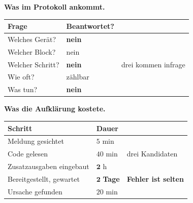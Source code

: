 \begin{merksatz}
\textbf{Was im Protokoll ankommt.}

\begin{center}
\begin{minipage}{0.86\textwidth}
\end{minipage}
\end{center}

\begin{center}
{\small
\renewcommand{\arraystretch}{1.45}
\begin{tabular}{@{}P{3.0cm}P{2.2cm}P{2.6cm}@{}}
\toprule
\textbf{Frage} & \textbf{Beantwortet?} & \\
\midrule
Welches Gerät? & \textcolor{akzent}{\textbf{nein}} & \\
Welcher Block? & \textcolor{akzent}{nein} & \\
Welcher Schritt? & \textcolor{akzent}{\textbf{nein}} & \textcolor{akzent}{drei kommen infrage}\\
Wie oft? & \textcolor{mittel}{zählbar} & \\
Was tun? & \textcolor{akzent}{\textbf{nein}} & \\
\bottomrule
\end{tabular}}
\end{center}

\begin{center}
\begin{minipage}{0.88\textwidth}
\end{minipage}
\end{center}

\textbf{Was die Aufklärung kostete.}

\begin{center}
\renewcommand{\arraystretch}{1.45}
\begin{tabular}{@{}P{3.0cm}P{2.2cm}P{2.6cm}@{}}
\toprule
\textbf{Schritt} & \textbf{Dauer} & \\
\midrule
Meldung gesichtet & $5$ min & \\
Code gelesen & $40$ min & \textcolor{akzent}{drei Kandidaten}\\
Zusatzausgaben eingebaut & $\mathbf{2}$ h & \\
Bereitgestellt, gewartet & \textcolor{akzent}{$\mathbf{2}$ \textbf{Tage}} & \textcolor{akzent}{\textbf{Fehler ist selten}}\\
Ursache gefunden & $20$ min & \\
\bottomrule
\end{tabular}
\end{center}

\begin{center}
\end{center}
\end{merksatz}

